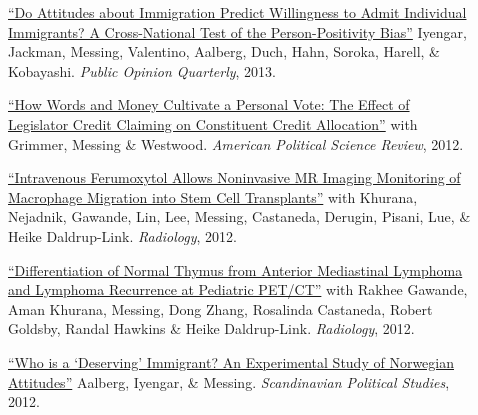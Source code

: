 \documentclass[letterpaper,11pt]{article}
\begin{document}
\begin{description}
\item[] \href{https://doi.org/10.1093/poq/nft024}{``Do Attitudes about Immigration Predict Willingness to Admit Individual Immigrants? A Cross-National Test of the Person-Positivity Bias''} Iyengar, Jackman, Messing, Valentino, Aalberg, Duch, Hahn, Soroka, Harell, \& Kobayashi. 
\emph{Public Opinion Quarterly}, 2013.

\item[] \href{http://stanford.edu/~jgrimmer/cc.pdf}{``How Words and Money Cultivate a Personal Vote: The Effect of Legislator Credit Claiming on Constituent Credit Allocation''} with Grimmer, Messing \& Westwood.
\emph{American Political Science Review}, 2012.

\item[] \href{http://radiology.rsna.org/content/264/3/803.full.pdf+html}{``Intravenous Ferumoxytol Allows Noninvasive MR Imaging Monitoring of Macrophage Migration into Stem Cell Transplants''} with Khurana, Nejadnik, Gawande, Lin, Lee, Messing, Castaneda, Derugin, Pisani, Lue, \& Heike Daldrup-Link. 
\emph{Radiology}, 2012.

\item[] \href{http://radiology.rsna.org/content/early/2011/12/11/radiol.11110715.long}{``Differentiation of Normal Thymus from Anterior Mediastinal Lymphoma and Lymphoma Recurrence at Pediatric PET/CT''} with Rakhee Gawande, Aman Khurana, Messing, Dong Zhang, Rosalinda Castaneda, Robert Goldsby, Randal Hawkins \& Heike Daldrup-Link. 
\emph{Radiology}, 2012.

\item[] \href{http://onlinelibrary.wiley.com/doi/10.1111/j.1467-9477.2011.00280.x/abstract}{``Who is a `Deserving' Immigrant? An Experimental Study of Norwegian Attitudes''} Aalberg, Iyengar, \& Messing. 
\emph{Scandinavian Political Studies}, 2012.
\end{description}
\end{document}
